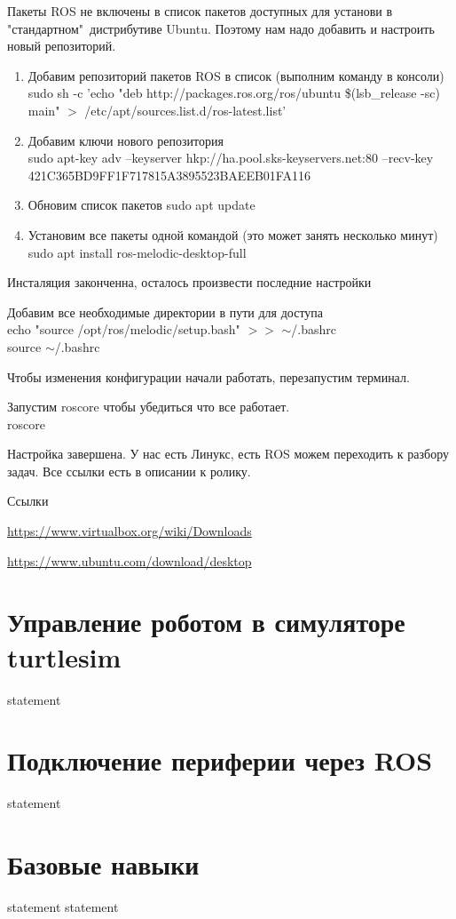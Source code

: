 Пакеты ROS не включены в список пакетов доступных для установи в "стандартном"\ дистрибутиве Ubuntu. Поэтому нам надо добавить и настроить новый репозиторий.
\begin{enumerate}
    \item Добавим репозиторий пакетов ROS в список (выполним команду в консоли)\\
    sudo sh -c 'echo "deb http://packages.ros.org/ros/ubuntu \$(lsb\_release -sc) main" $>$ /etc/apt/sources.list.d/ros-latest.list'
    \item Добавим ключи нового репозитория\\
    sudo apt-key adv --keyserver hkp://ha.pool.sks-keyservers.net:80 --recv-key \\ 421C365BD9FF1F717815A3895523BAEEB01FA116
    \item Обновим список пакетов
    sudo apt update
    \item Установим все пакеты одной командой (это может занять несколько минут)\\
    sudo apt install ros-melodic-desktop-full
\end{enumerate}

Инсталяция законченна, осталось произвести последние настройки

Добавим все необходимые директории в пути для доступа\\
echo "source /opt/ros/melodic/setup.bash" $>>$ $\sim$/.bashrc\\
source $\sim$/.bashrc

Чтобы изменения конфигурации начали работать, перезапустим терминал.

Запустим roscore чтобы убедиться что все работает.\\
roscore

Настройка завершена. У нас есть Линукс, есть ROS можем переходить к разбору задач.
Все ссылки есть в описании к ролику.

Ссылки

\url{https://www.virtualbox.org/wiki/Downloads}

\url{https://www.ubuntu.com/download/desktop}

\section{Управление роботом в симуляторе turtlesim}

{statement}

\section{Подключение периферии через ROS}

{statement}

\section{Базовые навыки}

{statement}
{statement}


